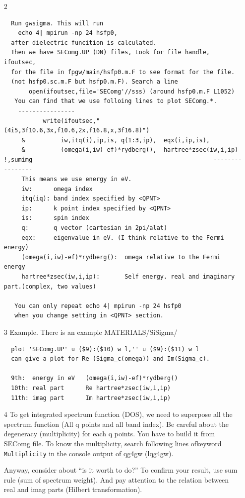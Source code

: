 \documentclass[a4paper,10pt,epsf,fleqn]{article}
\begin{document}
\begin{enumerate}
\begin{verbatim}
\end{verbatim}

\item[2]
\begin{verbatim}
  Run gwsigma. This will run 
    echo 4| mpirun -np 24 hsfp0,
  after dielectric funcition is calculated.
  Then we have SEComg.UP (DN) files, Look for file handle, ifoutsec,
  for the file in fpgw/main/hsfp0.m.F to see format for the file. 
  (not hsfp0.sc.m.F but hsfp0.m.F). Search a line
       open(ifoutsec,file='SEComg'//sss) (around hsfp0.m.F L1052)
   You can find that we use folloing lines to plot SEComg.*.
    ----------------                    
           write(ifoutsec,"(4i5,3f10.6,3x,f10.6,2x,f16.8,x,3f16.8)")
     &          iw,itq(i),ip,is, q(1:3,ip),  eqx(i,ip,is),
     &          (omega(i,iw)-ef)*rydberg(),  hartree*zsec(iw,i,ip) !,sumimg                                                   ----------------                    
     This means we use energy in eV. 
     iw:      omega index
     itq(iq): band index specified by <QPNT>
     ip:      k point index specified by <QPNT>
     is:      spin index
     q:       q vector (cartesian in 2pi/alat)
     eqx:     eigenvalue in eV. (I think relative to the Fermi energy)
     (omega(i,iw)-ef)*rydberg():  omega relative to the Fermi energy
     hartree*zsec(iw,i,ip):       Self energy. real and imaginary part.(complex, two values)

   You can only repeat echo 4| mpirun -np 24 hsfp0 
   when you change setting in <QPNT> section.
\end{verbatim}  

\item[3] Example.  There is an example MATERIALS/SiSigma/
\begin{verbatim}
  plot 'SEComg.UP' u ($9):($10) w l,'' u ($9):($11) w l
  can give a plot for Re (Sigma_c(omega)) and Im(Sigma_c).

  9th:  energy in eV   (omega(i,iw)-ef)*rydberg()
  10th: real part      Re hartree*zsec(iw,i,ip) 
  11th: imag part      Im hartree*zsec(iw,i,ip) 
\end{verbatim}

\item[4]
 To get integrated spectrum function (DOS), we need to superpose all the spectrum function
 (All q points and all band index). Be careful about the degeneracy (multiplicity) for each q points.
  You have to build it from SEComg file.
  To know the multiplicity, search following lines ofkeyword {\tt Multiplicity} in the console output of qg4gw (lqg4gw).

  Anyway, consider about ``is it worth to do?''
  To confirm your result, use sum rule (sum of spectrum weight). And pay attention to the relation
  between real and imag parts (Hilbert transformation).
\end{enumerate}
\newpage
\end{document}
